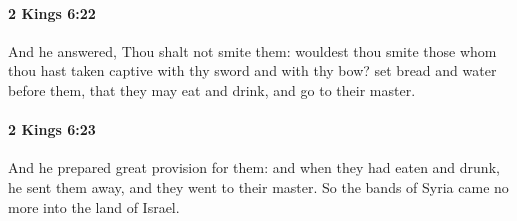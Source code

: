 		\paragraph{2 Kings 6:22} %
			\label{2KINGS-6-22}

			And he answered, Thou shalt not smite them: wouldest thou smite those whom thou hast taken captive with thy sword and with thy bow? set bread and water before them, that they may eat and drink, and go to their master.


		\paragraph{2 Kings 6:23} %
			\label{2KINGS-6-23}

			And he prepared great provision for them: and when they had eaten and drunk, he sent them away, and they went to their master. So the bands of Syria came no more into the land of Israel.

